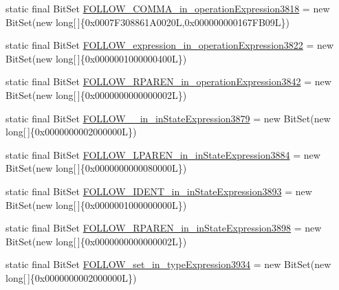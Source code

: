 \begin{DoxyCompactItemize}
\item 
static final Bit\-Set \hyperlink{classorg_1_1tzi_1_1use_1_1parser_1_1soil_1_1_soil_parser_ad785226c736e802e0bc36217387f2a46}{F\-O\-L\-L\-O\-W\-\_\-\-C\-O\-M\-M\-A\-\_\-in\-\_\-operation\-Expression3818} = new Bit\-Set(new long\mbox{[}$\,$\mbox{]}\{0x0007\-F308861\-A0020\-L,0x000000000167\-F\-B09\-L\})
\item 
static final Bit\-Set \hyperlink{classorg_1_1tzi_1_1use_1_1parser_1_1soil_1_1_soil_parser_a40aaa163d119d9b3e9572e7f3d443e80}{F\-O\-L\-L\-O\-W\-\_\-expression\-\_\-in\-\_\-operation\-Expression3822} = new Bit\-Set(new long\mbox{[}$\,$\mbox{]}\{0x0000001000000400\-L\})
\item 
static final Bit\-Set \hyperlink{classorg_1_1tzi_1_1use_1_1parser_1_1soil_1_1_soil_parser_a50e0c50ffac3579b31736b3fb8504a4d}{F\-O\-L\-L\-O\-W\-\_\-\-R\-P\-A\-R\-E\-N\-\_\-in\-\_\-operation\-Expression3842} = new Bit\-Set(new long\mbox{[}$\,$\mbox{]}\{0x0000000000000002\-L\})
\item 
static final Bit\-Set \hyperlink{classorg_1_1tzi_1_1use_1_1parser_1_1soil_1_1_soil_parser_ad8d61554f4f12c0e23bacc4a4701a60d}{F\-O\-L\-L\-O\-W\-\_\-\_\-in\-\_\-in\-State\-Expression3879} = new Bit\-Set(new long\mbox{[}$\,$\mbox{]}\{0x0000000002000000\-L\})
\item 
static final Bit\-Set \hyperlink{classorg_1_1tzi_1_1use_1_1parser_1_1soil_1_1_soil_parser_a427ab4d6ca69c7caa4c98586227f3268}{F\-O\-L\-L\-O\-W\-\_\-\-L\-P\-A\-R\-E\-N\-\_\-in\-\_\-in\-State\-Expression3884} = new Bit\-Set(new long\mbox{[}$\,$\mbox{]}\{0x0000000000080000\-L\})
\item 
static final Bit\-Set \hyperlink{classorg_1_1tzi_1_1use_1_1parser_1_1soil_1_1_soil_parser_a1fc997a46b66dc17dc238541d80da5ab}{F\-O\-L\-L\-O\-W\-\_\-\-I\-D\-E\-N\-T\-\_\-in\-\_\-in\-State\-Expression3893} = new Bit\-Set(new long\mbox{[}$\,$\mbox{]}\{0x0000001000000000\-L\})
\item 
static final Bit\-Set \hyperlink{classorg_1_1tzi_1_1use_1_1parser_1_1soil_1_1_soil_parser_a1acb9b45a54afe7b8f70ca8f49c2b3ee}{F\-O\-L\-L\-O\-W\-\_\-\-R\-P\-A\-R\-E\-N\-\_\-in\-\_\-in\-State\-Expression3898} = new Bit\-Set(new long\mbox{[}$\,$\mbox{]}\{0x0000000000000002\-L\})
\item 
static final Bit\-Set \hyperlink{classorg_1_1tzi_1_1use_1_1parser_1_1soil_1_1_soil_parser_aef810f6b076046b5102f85c99d0d26b0}{F\-O\-L\-L\-O\-W\-\_\-set\-\_\-in\-\_\-type\-Expression3934} = new Bit\-Set(new long\mbox{[}$\,$\mbox{]}\{0x0000000002000000\-L\})
\item 

\end{DoxyCompactItemize}
